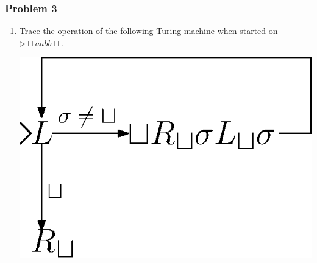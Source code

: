 \documentclass[11.5pt]{beamer}
\begin{document}
\begin{frame}[t]
\frametitle{Problem 3}
\begin{enumerate}[(3)]
\item Trace the operation of the following Turing machine when started on $\triangleright{\sqcup} aabb\underline{\sqcup}$.
\begin{center}
\includegraphics[scale = 0.6]{q3.eps}
\end{center}

\vspace{2em}
\end{enumerate}
\end{frame}
\end{document}
